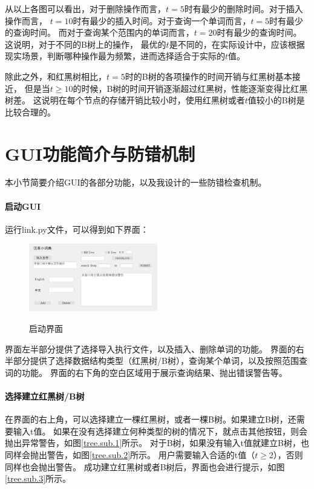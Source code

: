 \documentclass{article}
\begin{document}
从以上各图可以看出，对于删除操作而言，$t=5$时有最少的删除时间。对于插入操作而言，
$t=10$时有最少的插入时间。对于查询一个单词而言，$t=5$时有最少的查询时间。
而对于查询某个范围内的单词而言，$t=20$时有最少的查询时间。这说明，对于不同的B树上的操作，
最优的$t$是不同的，在实际设计中，应该根据现实场景，判断哪种操作最为频繁，进而选择适合于实际的$t$值。

除此之外，和红黑树相比，$t=5$时的B树的各项操作的时间开销与红黑树基本接近，
但是当$t\ge 10$的时候，B树的时间开销逐渐超过红黑树，性能逐渐变得比红黑树差。
这说明在每个节点的存储开销比较小时，使用红黑树或者$t$值较小的B树是比较合理的。

\section{GUI功能简介与防错机制}
本小节简要介绍GUI的各部分功能，以及我设计的一些防错检查机制。

\paragraph{启动GUI} 运行link.py文件，可以得到如下界面：

\begin{figure}[H]
	\centering
	{\includegraphics[width=0.5\textwidth]{GUI//启动界面.png}} 
	\caption{启动界面}
\end{figure}

界面左半部分提供了选择导入执行文件，以及插入、删除单词的功能。
界面的右半部分提供了选择数据结构类型（红黑树/B树），查询某个单词，以及按照范围查词的功能。
界面的右下角的空白区域用于展示查询结果、抛出错误警告等。


\paragraph{选择建立红黑树/B树}在界面的右上角，可以选择建立一棵红黑树，或者一棵B树。如果建立B树，还需要输入t值。
如果在没有选择建立何种类型的树的情况下，就点击其他按钮，则会抛出异常警告，如图\ref{tree.sub.1}所示。
对于B树，如果没有输入t值就建立B树，也同样会抛出警告，如图\ref{tree.sub.2}所示。
用户需要输入合适的t值（$t\ge$2），否则同样也会抛出警告。
成功建立红黑树或者B树后，界面也会进行提示，如图\ref{tree.sub.3}所示。
\end{document}

